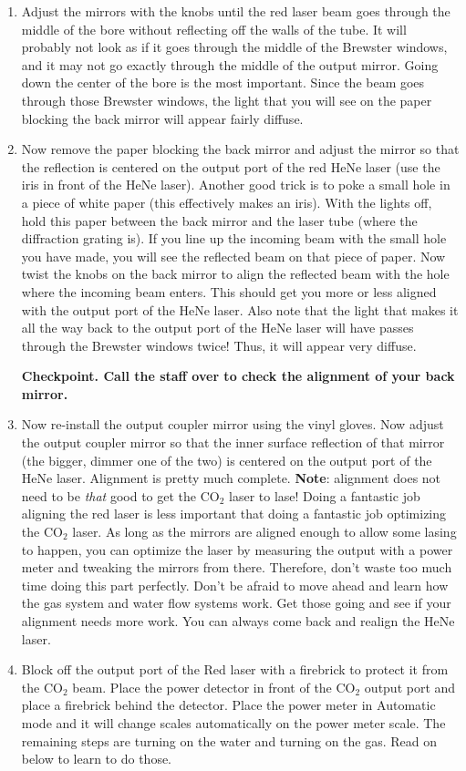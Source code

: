 \documentclass{../lab}
\begin{document}
\begin{enumerate}
    \item Adjust the mirrors with the knobs until the red laser beam goes through the middle of the bore without reflecting off the walls of the tube. It will probably not look as if it goes through the middle of the Brewster windows, and it may not go exactly through the middle of the output mirror. Going down the center of the bore is the most important. Since the beam goes through those Brewster windows, the light that you will see on the paper blocking the back mirror will appear fairly diffuse.

    \item Now remove the paper blocking the back mirror and adjust the mirror so that the reflection is centered on the output port of the red HeNe laser (use the iris in front of the HeNe laser). Another good trick is to poke a small hole in a piece of white paper (this effectively makes an iris). With the lights off, hold this paper between the back mirror and the laser tube (where the diffraction grating is). If you line up the incoming beam with the small hole you have made, you will see the reflected beam on that piece of paper. Now twist the knobs on the back mirror to align the reflected beam with the hole where the incoming beam enters. This should get you more or less aligned with the output port of the HeNe laser. Also note that the light that makes it all the way back to the output port of the HeNe laser will have passes through the Brewster windows twice! Thus, it will appear very diffuse.
    
    \textbf{Checkpoint. Call the staff over to check the alignment of your back mirror.}

    \item Now re-install the output coupler mirror using the vinyl gloves. Now adjust the output coupler mirror so that the inner surface reflection of that mirror (the bigger, dimmer one of the two) is centered on the output port of the HeNe laser. Alignment is pretty much complete. \textbf{Note}: alignment does not need to be \emph{that} good to get the CO$_2$ laser to lase! Doing a fantastic job aligning the red laser is less important that doing a fantastic job optimizing the CO$_2$ laser. As long as the mirrors are aligned enough to allow some lasing to happen, you can optimize the laser by measuring the output with a power meter and tweaking the mirrors from there. Therefore, don't waste too much time doing this part perfectly. Don't be afraid to move ahead and learn how the gas system and water flow systems work. Get those going and see if your alignment needs more work. You can always come back and realign the HeNe laser.

    \item Block off the output port of the Red laser with a firebrick to protect it from the CO$_2$ beam. Place the power detector in front of the CO$_2$ output port and place a firebrick behind the detector. Place the power meter in Automatic mode and it will change scales automatically on the power meter scale. The remaining steps are turning on the water and turning on the gas. Read on below to learn to do those.

\end{enumerate}
\end{document}
